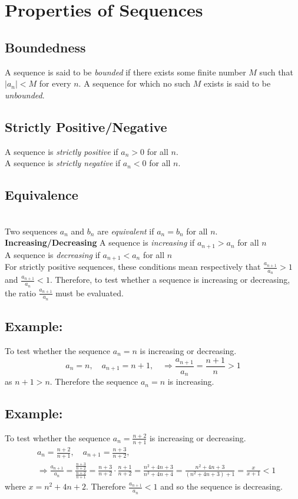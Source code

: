 \documentclass[]{report}
\begin{document}
\section{Properties of Sequences}

\subsection{Boundedness}
A sequence is said to be \emph{bounded} if there exists some finite number $M$ such that $|a_n|<M$ for every $n$. A sequence for which no such $M$ exists is said to be \emph{unbounded}.\\
\subsection{Strictly Positive/Negative}
A sequence is \emph{strictly positive} if $a_n > 0$ for all $n$.\\
A sequence is \emph{strictly negative} if $a_n < 0$ for all $n$.\\
\subsection{Equivalence}\\
Two sequences $a_n$ and $b_n$ are \emph{equivalent} if $a_n = b_n$ for all $n$.\\
\textbf{Increasing/Decreasing}
A sequence is \emph{increasing} if $a_{n+1} > a_n$ for all $n$\\
A sequence is \emph{decreasing} if $a_{n+1} < a_n$ for all $n$\\

For strictly positive sequences, these conditions mean respectively that $\frac{a_{n+1}}{a_n} > 1$ and $\frac{a_{n+1}}{a_n} < 1$. Therefore, to test whether a sequence is increasing or decreasing, the ratio $\frac{a_{n+1}}{a_n}$ must be evaluated.

\subsection{ Example:}
To test whether the sequence $a_n=n$ is increasing or decreasing.
\begin{equation*}
  a_n=n,\quad a_{n+1}=n+1,\quad \Rightarrow \frac{a_{n+1}}{a_n}=\frac{n+1}{n} > 1 
\end{equation*}
as $n+1 >n$. Therefore the sequence $a_n=n$ is increasing.

\subsection{ Example:}
To test whether the sequence $a_n=\frac{n+2}{n+1}$ is increasing or decreasing.
\begin{align*}
  &a_n=\frac{n+2}{n+1},\quad a_{n+1}=\frac{n+3}{n+2},\\
  &\Rightarrow \frac{a_{n+1}}{a_n}=\frac{\frac{n+3}{n+2}}{\frac{n+2}{n+1}}= \frac{n+3}{n+2}\cdot \frac{n+1}{n+2} = \frac{n^2+4n+3}{n^2+4n+4} = \frac{n^2+4n+3}{\left(n^2+4n+3\right)+1}=\frac{x}{x+1}<1 
\end{align*}
where $x=n^2+4n+2$. Therefore $\frac{a_{n+1}}{a_n}<1$ and so the sequence is decreasing.
\pagebreak
\end{document}
